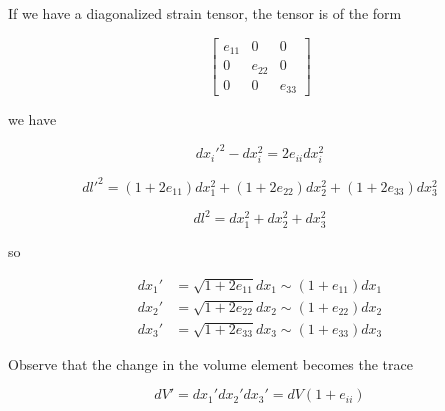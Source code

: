 If we have a diagonalized strain tensor, the tensor is of the form

\begin{equation}\label{eqn:continuumL3:110}
\begin{bmatrix}
e_{11} & 0 & 0 \\
0 & e_{22} & 0 \\
0 & 0 & e_{33} 
\end{bmatrix}
\end{equation}

we have

\begin{equation}\label{eqn:continuumL3:130}
{dx_i'}^2 - dx_i^2 = 2 e_{ii} dx_i^2
\end{equation}

\begin{equation}\label{eqn:continuumL3:150}
{dl'}^2 = 
(1 + 2 e_{11}) dx_1^2
+(1 + 2 e_{22}) dx_2^2
+(1 + 2 e_{33}) dx_3^2
\end{equation}

\begin{equation}\label{eqn:continuumL3:170}
dl^2 = 
dx_1^2
+dx_2^2
+dx_3^2
\end{equation}

so 

\begin{align}\label{eqn:continuumL3:190}
dx_1' &= \sqrt{1 + 2 e_{11}} dx_1 \sim ( 1 + e_{11}) dx_1 \\
dx_2' &= \sqrt{1 + 2 e_{22}} dx_2 \sim ( 1 + e_{22}) dx_2 \\
dx_3' &= \sqrt{1 + 2 e_{33}} dx_3 \sim ( 1 + e_{33}) dx_3
\end{align}

Observe that the change in the volume element becomes the trace

\begin{equation}\label{eqn:continuumL3:210}
dV' = 
dx_1'
dx_2'
dx_3'
= dV(1 + e_{ii})
\end{equation}

